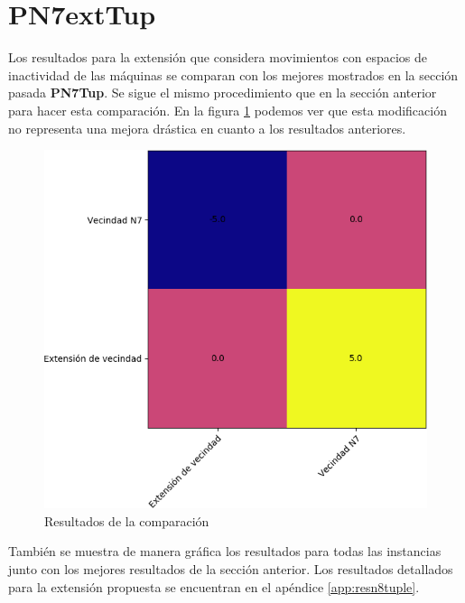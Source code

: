\section{PN7extTup}
Los resultados para la extensión que considera movimientos con espacios de inactividad de las máquinas se comparan con los mejores mostrados en la sección pasada \textbf{PN7Tup}. Se sigue el mismo procedimiento que en la sección anterior para hacer esta comparación. En la figura \ref{fig:n8vsn7} podemos ver que esta modificación no representa una mejora drástica en cuanto a los resultados anteriores.

\begin{figure}[H]
    \centering
    \includegraphics[scale=.7]{Imagenes/n8vsn7.png}
    \caption{Resultados de la comparación}
    \label{fig:n8vsn7}
\end{figure}

También se muestra de manera gráfica los resultados para todas las instancias junto con los mejores resultados de la sección anterior. Los resultados detallados para la extensión propuesta se encuentran en el apéndice \ref{app:resn8tuple}.

